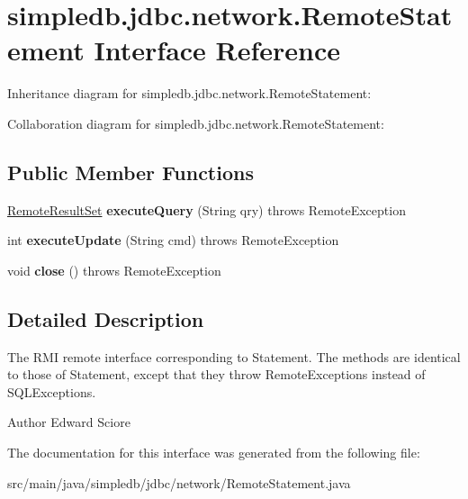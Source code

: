 \hypertarget{interfacesimpledb_1_1jdbc_1_1network_1_1RemoteStatement}{}\section{simpledb.\+jdbc.\+network.\+Remote\+Statement Interface Reference}
\label{interfacesimpledb_1_1jdbc_1_1network_1_1RemoteStatement}


Inheritance diagram for simpledb.\+jdbc.\+network.\+Remote\+Statement\+:


Collaboration diagram for simpledb.\+jdbc.\+network.\+Remote\+Statement\+:
\subsection*{Public Member Functions}
\begin{DoxyCompactItemize}
\item 
\mbox{\label{interfacesimpledb_1_1jdbc_1_1network_1_1RemoteStatement_a10d239804cab7ff035344d142191023e}} 
\hyperlink{interfacesimpledb_1_1jdbc_1_1network_1_1RemoteResultSet}{Remote\+Result\+Set} {\bfseries execute\+Query} (String qry)  throws Remote\+Exception
\item 
\mbox{\label{interfacesimpledb_1_1jdbc_1_1network_1_1RemoteStatement_aa147f4ea2fb0a8ddeca88966e676c4e1}} 
int {\bfseries execute\+Update} (String cmd)  throws Remote\+Exception
\item 
\mbox{\label{interfacesimpledb_1_1jdbc_1_1network_1_1RemoteStatement_a300f26902ee5269f621acb197d6e3b2b}} 
void {\bfseries close} ()  throws Remote\+Exception
\end{DoxyCompactItemize}


\subsection{Detailed Description}
The R\+MI remote interface corresponding to Statement. The methods are identical to those of Statement, except that they throw Remote\+Exceptions instead of S\+Q\+L\+Exceptions. \begin{DoxyAuthor}{Author}
Edward Sciore 
\end{DoxyAuthor}


The documentation for this interface was generated from the following file\+:\begin{DoxyCompactItemize}
\item 
src/main/java/simpledb/jdbc/network/Remote\+Statement.\+java\end{DoxyCompactItemize}
